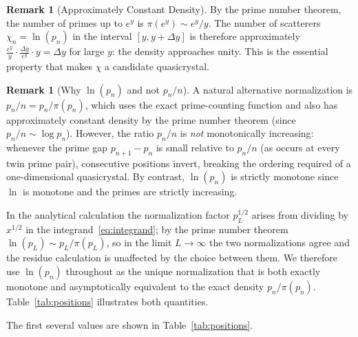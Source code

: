 \documentclass[11pt, oneside]{article}
\theoremstyle{definition}
\newtheorem{remark}[theorem]{Remark}
\begin{document}
\begin{remark}[Approximately Constant Density]
By the prime number theorem, the number of primes up to $e^y$ is
$\pi(e^y) \sim e^y/y$. The number of scatterers
$\chi_n = \ln(p_n)$ in the interval $[y, y+\Delta y]$ is therefore
approximately $\frac{e^y}{y}\cdot\frac{\Delta y}{e^y}\cdot y
= \Delta y$ for large $y$: the density approaches unity.
This is the essential property that makes $\chi$ a candidate
quasicrystal.
\end{remark}

\begin{remark}[Why $\ln(p_n)$ and not $p_n/n$]
\label{rem:monotonicity}
A natural alternative normalization is $p_n/n = p_n/\pi(p_n)$,
which uses the exact prime-counting function and also has
approximately constant density by the prime number theorem
(since $p_n/n \sim \log p_n$). However, the ratio $p_n/n$
is \emph{not} monotonically increasing: whenever the prime gap
$p_{n+1} - p_n$ is small relative to $p_n/n$ (as occurs at every
twin prime pair), consecutive positions invert, breaking the
ordering required of a one-dimensional quasicrystal.
By contrast, $\ln(p_n)$ is strictly monotone since $\ln$ is
monotone and the primes are strictly increasing.

In the analytical calculation the normalization factor
$p_L^{1/2}$ arises from dividing by $x^{1/2}$ in the
integrand~\eqref{eq:integrand}; by the prime number theorem
$\ln(p_L) \sim p_L/\pi(p_L)$, so in the limit $L\to\infty$
the two normalizations agree and the residue
calculation is unaffected by the choice between them.
We therefore use $\ln(p_n)$ throughout as the unique
normalization that is both exactly monotone and asymptotically
equivalent to the exact density $p_n/\pi(p_n)$.
Table~\ref{tab:positions} illustrates both quantities.
\end{remark}

The first several values are shown in Table~\ref{tab:positions}.
\end{document}
